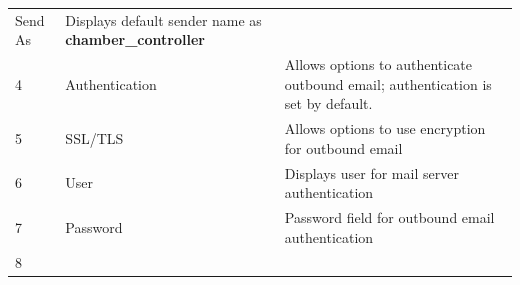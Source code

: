\begin{longtable}[]{@{}lll@{}}
\begin{minipage}[t]{0.23\columnwidth}
Send As\strut
\end{minipage} & \begin{minipage}[t]{0.65\columnwidth}\raggedright
Displays default sender name as \textbf{chamber\_controller}\strut
\end{minipage}\tabularnewline
\begin{minipage}[t]{0.04\columnwidth}\raggedright
4\strut
\end{minipage} & \begin{minipage}[t]{0.23\columnwidth}\raggedright
Authentication\strut
\end{minipage} & \begin{minipage}[t]{0.65\columnwidth}\raggedright
Allows options to authenticate outbound email; authentication is set by
default.\strut
\end{minipage}\tabularnewline
\begin{minipage}[t]{0.04\columnwidth}\raggedright
5\strut
\end{minipage} & \begin{minipage}[t]{0.23\columnwidth}\raggedright
SSL/TLS\strut
\end{minipage} & \begin{minipage}[t]{0.65\columnwidth}\raggedright
Allows options to use encryption for outbound email\strut
\end{minipage}\tabularnewline
\begin{minipage}[t]{0.04\columnwidth}\raggedright
6\strut
\end{minipage} & \begin{minipage}[t]{0.23\columnwidth}\raggedright
User\strut
\end{minipage} & \begin{minipage}[t]{0.65\columnwidth}\raggedright
Displays user for mail server authentication\strut
\end{minipage}\tabularnewline
\begin{minipage}[t]{0.04\columnwidth}\raggedright
7\strut
\end{minipage} & \begin{minipage}[t]{0.23\columnwidth}\raggedright
Password\strut
\end{minipage} & \begin{minipage}[t]{0.65\columnwidth}\raggedright
Password field for outbound email authentication\strut
\end{minipage}\tabularnewline
\begin{minipage}[t]{0.04\columnwidth}\raggedright
8\strut
\end{minipage} & \begin{minipage}[t]{0.23\columnwidth}\raggedright

\end{minipage}
\end{longtable}
